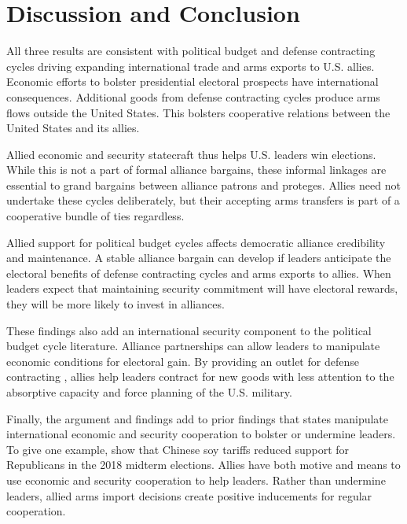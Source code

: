 \documentclass[12pt]{article}
\begin{document}
\section{Discussion and Conclusion}


All three results are consistent with political budget and defense contracting cycles driving expanding international trade and arms exports to U.S. allies. 
Economic efforts to bolster presidential electoral prospects have international consequences. 
Additional goods from defense contracting cycles produce arms flows outside the United States.
This bolsters cooperative relations between the United States and its allies.


Allied economic and security statecraft thus helps U.S. leaders win elections. 
While this is not a part of formal alliance bargains, these informal linkages are essential to grand bargains between alliance patrons and proteges.
Allies need not undertake these cycles deliberately, but their accepting arms transfers is part of a cooperative bundle of ties regardless.


Allied support for political budget cycles affects democratic alliance credibility and maintenance. 
A stable alliance bargain can develop if leaders anticipate the electoral benefits of defense contracting cycles and arms exports to allies.
When leaders expect that maintaining security commitment will have electoral rewards, they will be more likely to invest in alliances. 


These findings also add an international security component to the political budget cycle literature.
Alliance partnerships can allow leaders to manipulate economic conditions for electoral gain. 
By providing an outlet for defense contracting , allies help leaders contract for new goods with less attention to the absorptive capacity and force planning of the U.S. military.


Finally, the argument and findings add to prior findings that states manipulate international economic and security cooperation to bolster or undermine leaders. 
To give one example, \citet{ChyzhUrbatsch2021} show that Chinese soy tariffs reduced support for Republicans in the 2018 midterm elections. 
Allies have both motive and means to use economic and security cooperation to help leaders. 
Rather than undermine leaders, allied arms import decisions create positive inducements for regular cooperation.
\end{document}
